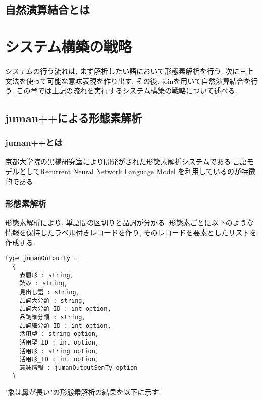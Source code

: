 \documentclass{jreport}
\begin{document}
\section{自然演算結合とは}


\section{}




\chapter{システム構築の戦略}
システムの行う流れは, まず解析したい語において形態素解析を行う. 次に三上文法を使って可能な意味表現を作り出す. 
その後, joinを用いて自然演算結合を行う.
この章では上記の流れを実行するシステム構築の戦略について述べる.
 
\section{juman++による形態素解析}
\subsection{juman++とは}
京都大学院の黒橋研究室により開発がされた形態素解析システムである.言語モデルとしてRecurrent Neural Network Language Model
を利用しているのが特徴的である.
\subsection{形態素解析}
形態素解析により, 単語間の区切りと品詞が分かる. 形態素ごとに以下のような情報を保持したラベル付きレコードを作り, 
そのレコードを要素としたリストを作成する.

\begin{Verbatim}
type jumanOutputTy = 
  {
    表層形 : string, 
    読み : string,
    見出し語 : string,
    品詞大分類 : string,
    品詞大分類_ID : int option,
    品詞細分類 : string,
    品詞細分類_ID : int option, 
    活用型 : string option,
    活用型_ID : int option,
    活用形 : string option,
    活用形_ID : int option,
    意味情報 : jumanOutputSemTy option
  }
\end{Verbatim}

"象は鼻が長い"の形態素解析の結果を以下に示す.
\end{document}
